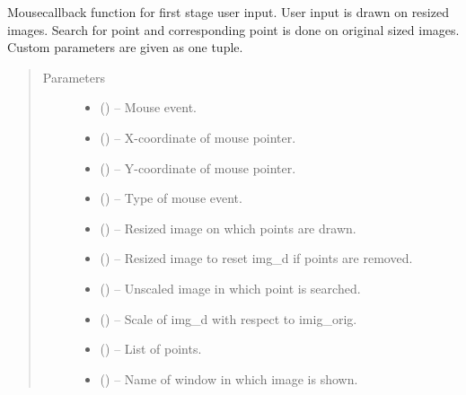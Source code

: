 \documentclass[letterpaper,10pt,english]{sphinxmanual}
\begin{document}
\begin{fulllineitems}
\label{\detokenize{aaap_re_photo:aaap_re_photo.onMouse_stage_one}}
Mousecallback function for first stage user input.
User input is drawn on resized images. Search for point and corresponding
point is done on original sized images.
Custom parameters are given as one tuple.
\begin{quote}\begin{description}
\item[{Parameters}] \leavevmode\begin{itemize}
\item {} 
 () -- Mouse event.

\item {} 
 () -- X-coordinate of mouse pointer.

\item {} 
 () -- Y-coordinate of mouse pointer.

\item {} 
 () -- Type of mouse event.

\item {} 
 () -- Resized image on which points are drawn.

\item {} 
 () -- Resized image to reset img\_d if points are removed.

\item {} 
 () -- Unscaled image in which point is searched.

\item {} 
 () -- Scale of img\_d with respect to imig\_orig.

\item {} 
 () -- List of points.

\item {} 
 () -- Name of window in which image is shown.


\end{itemize}
\end{description}
\end{quote}
\end{fulllineitems}
\end{document}
